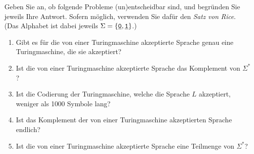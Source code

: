 \documentclass[10pt,a4paper]{scrartcl}
\newif\ifLoesung
\newcommand\Loesung[1]{\ifLoesung\begin{solution}#1\end{solution}\fi}
\newcommand{\ul}[1]{\underline{#1}} %
\newcommand\sy[1]{{\underline{\ifmmode\mathtt{#1}\else\texttt{#1}\fi}}} %
\begin{document}
\Loesung{%
\begin{enumerate}
\item
Jedenfalls, wenn C entscheidbar ist, so ist auch das Komplement entscheidbar. Da die Reduktion ist transitiv.
\item
Keinesfalls, wenn das Komplement von B nicht entscheidbar ist, so kann Komp von C auch nicht entscheidbar sein.
\item
Jedenfalls, da die Vereinigung von B und D auch eine Teilmenge von C ist.
\item
Vielleicht, aber nur wenn A entscheidbar ist.
\item
Vielleicht, da D entscheidbar sein koennte.

\end{enumerate}
}
\begin{question}
Geben Sie an, ob folgende Probleme (un)entscheidbar sind, und begr\"unden Sie jeweils
Ihre Antwort. Sofern m\"oglich, verwenden Sie daf\"ur den \textit{Satz von Rice}.
(Das Alphabet ist dabei jeweils $\Sigma=\{\sy 0, \sy 1\}$.)

\begin{enumerate}
\item Gibt es f\"ur die von einer Turingmaschine akzeptierte Sprache genau eine Turingmaschine, die sie akzeptiert?
\item Ist die von einer Turingmaschine akzeptierte Sprache das Komplement von $\Sigma^*$?
\item Ist die Codierung der Turingmaschine, welche die Sprache $L$ akzeptiert, weniger als 1000 Symbole lang?
\item Ist das Komplement der von einer Turingmaschine akzeptierten Sprache endlich?
\item Ist die von einer Turingmaschine akzeptierte Sprache eine Teilmenge von $\Sigma^*$?
\end{enumerate}

\end{question}
\end{document}
